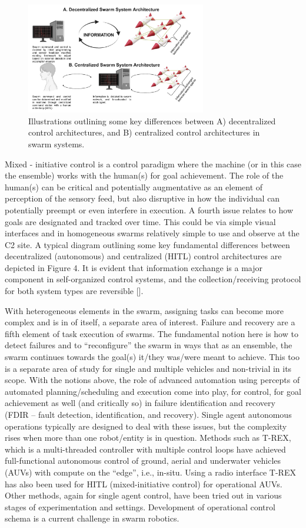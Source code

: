\begin{figure}[!h]
  \centering
  \includegraphics[width=0.7\textwidth]{control.jpg}
  \caption{Illustrations outlining some key differences between A) decentralized control architectures, and B) centralized control architectures in swarm systems. }
  \label{fig:platforms}
\end{figure}

Mixed - initiative control is a control paradigm where the machine (or in this case the ensemble) works with the human(s) for goal achievement. The role of the human(s) can be critical and potentially augmentative as an element of perception of the sensory feed, but also disruptive in how the individual can potentially preempt or even interfere in execution. A fourth issue relates to how goals are designated and tracked over time. This could be via simple visual interfaces and in homogeneous swarms relatively simple to use and observe at the C2 site. A typical diagram outlining some key fundamental differences between decentralized (autonomous) and centralized (HITL) control architectures are depicted in Figure 4. It is evident that information exchange is a major component in self-organized control systems, and the collection/receiving protocol for both system types are reversible [].


With heterogeneous elements in the swarm, assigning tasks can become more complex and is in of itself, a separate area of interest. Failure and recovery are a fifth element of task execution of swarms. The fundamental notion here is how to detect failures and to “reconfigure” the swarm in ways that as an ensemble, the swarm continues towards the goal(s) it/they was/were meant to achieve. This too is a separate area of study for single and multiple vehicles and non-trivial in its scope. With the notions above, the role of advanced automation using percepts of automated planning/scheduling and execution come into play, for control, for goal achievement as well (and critically so) in failure identification and recovery (FDIR – fault detection, identification, and recovery). Single agent autonomous operations typically are designed to deal with these issues, but the complexity rises when more than one robot/entity is in question. Methods such as T-REX, which is a multi-threaded controller with multiple control loops have achieved full-functional autonomous control of ground, aerial and underwater vehicles (AUVs) with compute on the “edge”, i.e., in-situ. Using a radio interface T-REX has also been used for HITL (mixed-initiative control) for operational AUVs. Other methods, again for single agent control, have been tried out in various stages of experimentation and settings. Development of operational control schema is a current challenge in swarm robotics.
